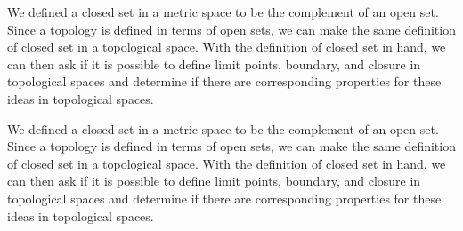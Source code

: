 \label{chap:Closure_interior_topology}


\vspace*{-17 pt}

\vspace*{13 pt}

\label{sec_closure_int_top_intro}
We defined a closed set in a metric space to be the complement of an open set. Since a topology is defined in terms of open sets, we can make the same definition of closed set in a topological space. With the definition of closed set in hand, we can then ask if it is possible to define limit points, boundary, and closure in topological spaces and determine if there are corresponding properties for these ideas in topological spaces. 

We defined a closed set in a metric space to be the complement of an open set. Since a topology is defined in terms of open sets, we can make the same definition of closed set in a topological space. With the definition of closed set in hand, we can then ask if it is possible to define limit points, boundary, and closure in topological spaces and determine if there are corresponding properties for these ideas in topological spaces. 

